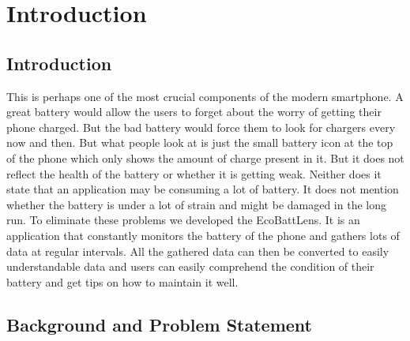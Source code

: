 \documentclass[12pt,a4paper]{report}
\begin{document}
\clearpage

\tableofcontents
\clearpage

\listoftables
{}

\listoffigures
{}
\clearpage

\setcounter{page}{1}
\chapter{Introduction}

\section{Introduction}

This is perhaps one of the most crucial components of the modern smartphone. A great battery would allow the users to forget about the worry of getting their phone charged. But the bad battery would force them to look for chargers every now and then. But what people look at is just the small battery icon at the top of the phone which only shows the amount of charge present in it. But it does not reflect the health of the battery or whether it is getting weak. Neither does it state that an application may be consuming a lot of battery. It does not mention whether the battery is under a lot of strain and might be damaged in the long run. To eliminate these problems we developed the EcoBattLens. It is an application that constantly monitors the battery of the phone and gathers lots of data at regular intervals. All the gathered data can then be converted to easily understandable data and users can easily comprehend the condition of their battery and get tips on how to maintain it well.

\section{Background and Problem Statement}
\end{document}

